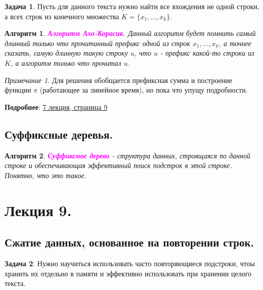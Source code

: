 \documentclass[a4paper]{article}
\theoremstyle{indented}
\newtheorem{alg}{Алгоритм}
\theoremstyle{definition}
\newtheorem{prob}{Задача}
\theoremstyle{remark}
\newtheorem{remark}{Примечание}
\begin{document}
\begin{prob}
    Пусть для данного текста нужно найти все вхождения не одной строки, а всех строк из конечного множества $K=\{x_1, \ldots, x_k\}$. 
\end{prob}

\begin{alg}
    \textcolor{magenta}{\hypertarget{t33}{\textbf{Алгоритм Ахо-Корасик}}}. Данный алгоритм будет помнить самый длинный только что прочитанный префикс одной из строк $x_1, \ldots, x_k$, а точнее сказать, самую длинную такую строку $u$, что $u$ - префикс какой-то строки из $K$, и алгоритм только что прочитал $u$. 
\end{alg}

\begin{remark}
    Для решения обобщается префиксная сумма и построение функции $\pi$ (работающее за линейное время), но пока что упущу подробности.
\end{remark}

\textbf{Подробнее}: \href{https://users.math-cs.spbu.ru/~okhotin/teaching/algorithms_2020/okhotin_algorithms_2020_l7.pdf}{7 лекция, страница 9}

\subsection{Суффиксные деревья.}

\begin{alg}
    \textcolor{magenta}{\hypertarget{t34}{\textbf{Суффиксное дерево}}} - структура данных, строящаяся по данной строке и обеспечивающая эффективный поиск подстрок в этой строке. Понятно, что это такое.  
\end{alg}

\section{Лекция 9.}

\subsection{Сжатие данных, основанное на повторении строк.}

\begin{prob}
    Нужно научиться использовать часто повторяющиеся подстроки, чтоы хранить их отдельно в памяти и эффективно использовать при хранении целого текста.
\end{prob}
\end{document}
